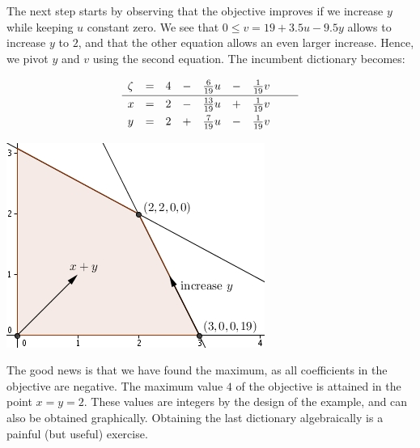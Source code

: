 \documentclass[ukenglish,a4]{article}
\begin{document}
The next step
starts by observing that the objective improves if we 
increase $y$ while keeping $u$ constant zero. We see that
$0\leq v = 19 + 3.5u - 9.5y$ allows to increase $y$ to $2$,
and that the other equation allows an even larger increase.
Hence, we pivot $y$ and $v$ using the second equation.
The incumbent dictionary becomes:
\vspace{.2cm}
	\begin{minipage}{.45\textwidth}
\[    
    \begin{array}{lcrcrcrcr}
      \zeta&=& 4 &-& \frac{6}{19} u &-& \frac{1}{19} v &\vphantom{\frac{|}{|}} &  \\\hline
      x    &=& 2 &-&\frac{13}{19} u &+& \frac{1}{19} v &\vphantom{\frac{|}{|}} &  \\
      y    &=& 2 &+& \frac{7}{19} u &-& \frac{1}{19} v &\vphantom{\frac{|}{|}} &  \\
    \end{array}
\]
\end{minipage}
	\begin{minipage}{.45\textwidth}
				\includegraphics{ex3.jpg}
\end{minipage}
\vspace{.2cm}

The good news is that we have found the maximum, as all coefficients in the objective
are negative. The maximum value $4$
of the objective is attained in the point $x=y=2$. These values are 
integers by the design of the example, and can also be obtained graphically.
Obtaining the last dictionary algebraically is a painful (but useful) exercise.
\end{document}
